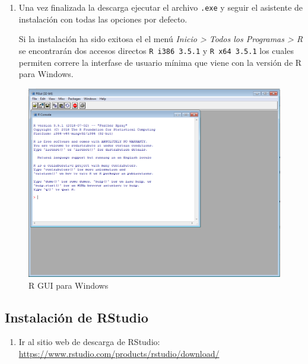 \documentclass[a4paper]{book}
\providecommand{\tightlist}{%
  \setlength{\itemsep}{0pt}\setlength{\parskip}{0pt}}
\begin{document}
\begin{enumerate}
\def\labelenumi{\arabic{enumi})}
\setcounter{enumi}{1}
\item
  Una vez finalizada la descarga ejecutar el archivo \texttt{.exe} y
  seguir el asistente de instalación con todas las opciones por defecto.

  Si la instalación ha sido exitosa el el menú \emph{Inicio
  \textgreater{} Todos los Programas \textgreater{} R} se encontrarán
  dos accesos directos \texttt{R\ i386\ 3.5.1} y \texttt{R\ x64\ 3.5.1}
  los cuales permiten correre la interfase de usuario mínima que viene
  con la versión de R para Windows.
\end{enumerate}

\begin{figure}[h]

{\centering \includegraphics[width=0.75\linewidth,]{images/rgui} 

}

\caption{R GUI para Windows}\label{fig:unnamed-chunk-7}
\end{figure}

\hypertarget{instalacion-de-rstudio}{%
\subsection{Instalación de RStudio}\label{instalacion-de-rstudio}}

\begin{enumerate}
\def\labelenumi{\arabic{enumi})}
\tightlist
\item
  Ir al sitio web de descarga de RStudio:
  \url{https://www.rstudio.com/products/rstudio/download/}
\end{enumerate}
\end{document}
